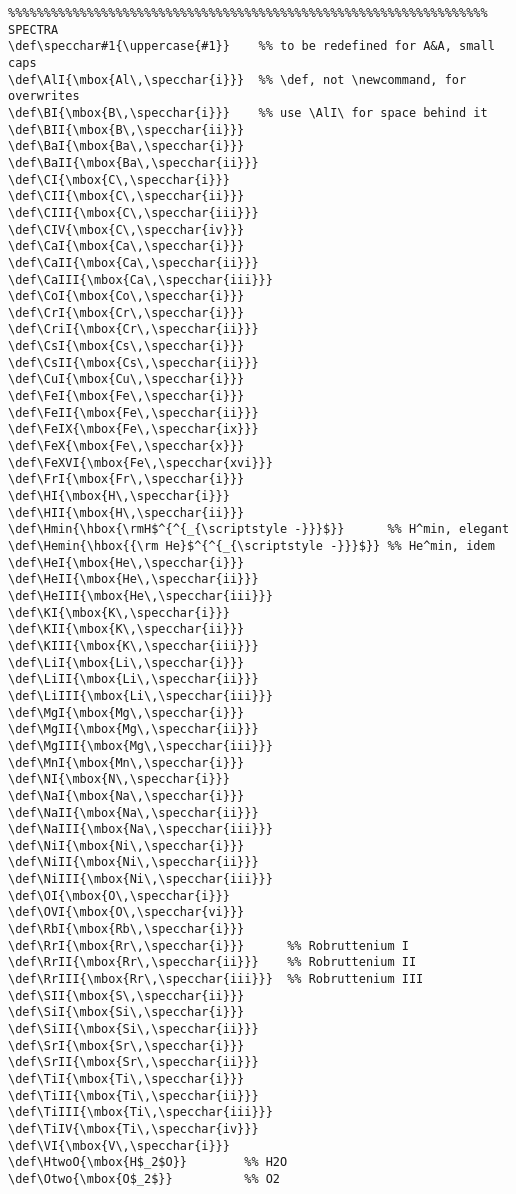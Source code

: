 {\begin{verbatim}
%%%%%%%%%%%%%%%%%%%%%%%%%%%%%%%%%%%%%%%%%%%%%%%%%%%%%%%%%%%%%%%%%%% SPECTRA
\def\specchar#1{\uppercase{#1}}    %% to be redefined for A&A, small caps
\def\AlI{\mbox{Al\,\specchar{i}}}  %% \def, not \newcommand, for overwrites 
\def\BI{\mbox{B\,\specchar{i}}}    %% use \AlI\ for space behind it
\def\BII{\mbox{B\,\specchar{ii}}}  
\def\BaI{\mbox{Ba\,\specchar{i}}}  
\def\BaII{\mbox{Ba\,\specchar{ii}}} 
\def\CI{\mbox{C\,\specchar{i}}} 
\def\CII{\mbox{C\,\specchar{ii}}} 
\def\CIII{\mbox{C\,\specchar{iii}}} 
\def\CIV{\mbox{C\,\specchar{iv}}} 
\def\CaI{\mbox{Ca\,\specchar{i}}} 
\def\CaII{\mbox{Ca\,\specchar{ii}}} 
\def\CaIII{\mbox{Ca\,\specchar{iii}}} 
\def\CoI{\mbox{Co\,\specchar{i}}} 
\def\CrI{\mbox{Cr\,\specchar{i}}} 
\def\CriI{\mbox{Cr\,\specchar{ii}}} 
\def\CsI{\mbox{Cs\,\specchar{i}}} 
\def\CsII{\mbox{Cs\,\specchar{ii}}} 
\def\CuI{\mbox{Cu\,\specchar{i}}} 
\def\FeI{\mbox{Fe\,\specchar{i}}} 
\def\FeII{\mbox{Fe\,\specchar{ii}}} 
\def\FeIX{\mbox{Fe\,\specchar{ix}}}
\def\FeX{\mbox{Fe\,\specchar{x}}}
\def\FeXVI{\mbox{Fe\,\specchar{xvi}}}
\def\FrI{\mbox{Fr\,\specchar{i}}}
\def\HI{\mbox{H\,\specchar{i}}} 
\def\HII{\mbox{H\,\specchar{ii}}} 
\def\Hmin{\hbox{\rmH$^{^{_{\scriptstyle -}}}$}}      %% H^min, elegant
\def\Hemin{\hbox{{\rm He}$^{^{_{\scriptstyle -}}}$}} %% He^min, idem
\def\HeI{\mbox{He\,\specchar{i}}} 
\def\HeII{\mbox{He\,\specchar{ii}}} 
\def\HeIII{\mbox{He\,\specchar{iii}}} 
\def\KI{\mbox{K\,\specchar{i}}} 
\def\KII{\mbox{K\,\specchar{ii}}} 
\def\KIII{\mbox{K\,\specchar{iii}}} 
\def\LiI{\mbox{Li\,\specchar{i}}} 
\def\LiII{\mbox{Li\,\specchar{ii}}} 
\def\LiIII{\mbox{Li\,\specchar{iii}}} 
\def\MgI{\mbox{Mg\,\specchar{i}}} 
\def\MgII{\mbox{Mg\,\specchar{ii}}} 
\def\MgIII{\mbox{Mg\,\specchar{iii}}} 
\def\MnI{\mbox{Mn\,\specchar{i}}} 
\def\NI{\mbox{N\,\specchar{i}}}
\def\NaI{\mbox{Na\,\specchar{i}}}
\def\NaII{\mbox{Na\,\specchar{ii}}}
\def\NaIII{\mbox{Na\,\specchar{iii}}} 
\def\NiI{\mbox{Ni\,\specchar{i}}} 
\def\NiII{\mbox{Ni\,\specchar{ii}}}
\def\NiIII{\mbox{Ni\,\specchar{iii}}} 
\def\OI{\mbox{O\,\specchar{i}}} 
\def\OVI{\mbox{O\,\specchar{vi}}}
\def\RbI{\mbox{Rb\,\specchar{i}}} 
\def\RrI{\mbox{Rr\,\specchar{i}}}      %% Robruttenium I
\def\RrII{\mbox{Rr\,\specchar{ii}}}    %% Robruttenium II
\def\RrIII{\mbox{Rr\,\specchar{iii}}}  %% Robruttenium III
\def\SII{\mbox{S\,\specchar{ii}}} 
\def\SiI{\mbox{Si\,\specchar{i}}} 
\def\SiII{\mbox{Si\,\specchar{ii}}} 
\def\SrI{\mbox{Sr\,\specchar{i}}}
\def\SrII{\mbox{Sr\,\specchar{ii}}}
\def\TiI{\mbox{Ti\,\specchar{i}}} 
\def\TiII{\mbox{Ti\,\specchar{ii}}} 
\def\TiIII{\mbox{Ti\,\specchar{iii}}} 
\def\TiIV{\mbox{Ti\,\specchar{iv}}} 
\def\VI{\mbox{V\,\specchar{i}}} 
\def\HtwoO{\mbox{H$_2$O}}        %% H2O
\def\Otwo{\mbox{O$_2$}}          %% O2


\end{verbatim}}

